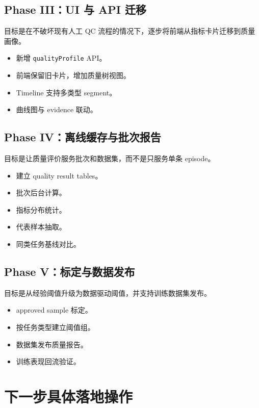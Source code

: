 \documentclass[UTF8,zihao=-4]{ctexart}
\newcommand{\Code}[1]{\texttt{#1}}
\begin{document}
\subsection{Phase III：UI 与 API 迁移}

目标是在不破坏现有人工 QC 流程的情况下，逐步将前端从指标卡片迁移到质量画像。

\begin{itemize}
\item 新增 \Code{qualityProfile} API。
\item 前端保留旧卡片，增加质量树视图。
\item Timeline 支持多类型 segment。
\item 曲线图与 evidence 联动。
\end{itemize}

\subsection{Phase IV：离线缓存与批次报告}

目标是让质量评价服务批次和数据集，而不是只服务单条 episode。

\begin{itemize}
\item 建立 quality result tables。
\item 批次后台计算。
\item 指标分布统计。
\item 代表样本抽取。
\item 同类任务基线对比。
\end{itemize}

\subsection{Phase V：标定与数据发布}

目标是从经验阈值升级为数据驱动阈值，并支持训练数据集发布。

\begin{itemize}
\item approved sample 标定。
\item 按任务类型建立阈值组。
\item 数据集发布质量报告。
\item 训练表现回流验证。
\end{itemize}

\section{下一步具体落地操作}
\end{document}
